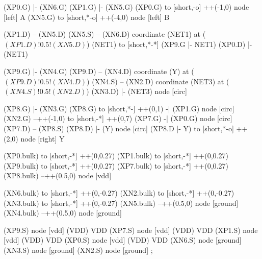 \begin{circuitikz}[american]
	
	
	(XP0.G) |- (XN6.G)
	(XP1.G) |- (XN5.G)
	(XP0.G) to [short,-o] ++(-1,0) node [left] {A}
	(XN5.G) to [short,*-o] ++(-4,0) node [left] {B}
	
	(XP1.D) -- (XN5.D)
	(XN5.S) -- (XN6.D)
	coordinate (NET1) at ($(XP1.D)!0.5!(XN5.D)$)
	(NET1) to [short,*-*] (XP9.G |- NET1)
	(XP0.D) |- (NET1)
	
	(XP9.G) |- (XN4.G)
	(XP9.D) -- (XN4.D)
	coordinate (Y) at ($(XP9.D)!0.5!(XN4.D)$)
	(XN4.S) -- (XN2.D)
	coordinate (NET3) at ($(XN4.S)!0.5!(XN2.D)$)
	(XN3.D) |- (NET3) node [circ] {}
	
	
	(XP8.G) |- (XN3.G)
	(XP8.G) to [short,*-] ++(0,1) -| (XP1.G) node [circ] {}
	(XN2.G) --++(-1,0) to [short,-*] ++(0,7)
	(XP7.G) -| (XP0.G) node [circ] {}
	(XP7.D) -- (XP8.S)
	(XP8.D) |- (Y) node [circ] {}
	(XP8.D |- Y) to [short,*-o] ++(2,0) node [right] {Y}
	
	(XP0.bulk) to [short,-*] ++(0,0.27)
	(XP1.bulk) to [short,-*] ++(0,0.27)
	(XP9.bulk) to [short,-*] ++(0,0.27)		
	(XP7.bulk) to [short,-*] ++(0,0.27)
	(XP8.bulk) --++(0.5,0) node [vdd] {}
	
	(XN6.bulk) to [short,-*] ++(0,-0.27)
	(XN2.bulk) to [short,-*] ++(0,-0.27)
	(XN3.bulk) to [short,-*] ++(0,-0.27)
	(XN5.bulk) --++(0.5,0) node [ground] {}
	(XN4.bulk) --++(0.5,0) node [ground] {}
	

	(XP9.S) node [vdd] (VDD) {VDD}
	(XP7.S) node [vdd] (VDD) {VDD}
	(XP1.S) node [vdd] (VDD) {VDD}
	(XP0.S) node [vdd] (VDD) {VDD}
	(XN6.S) node [ground] {}
	(XN3.S) node [ground] {}
	(XN2.S) node [ground] {}
;

\end{circuitikz}
